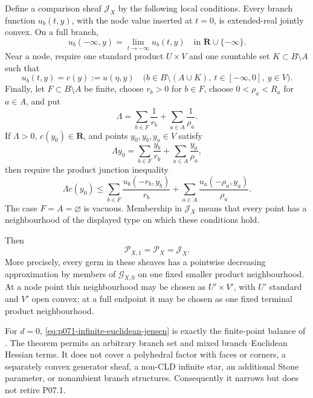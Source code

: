 \begin{theorem}
Define a comparison sheaf $\mathcal J_X$ by the following local
conditions.  Every branch function $u_b(t,y)$, with the node value
inserted at $t=0$, is extended-real jointly convex.  On a full branch,
\begin{equation}
 u_b(-\infty,y)=\lim_{t\to-\infty}u_b(t,y)
 \quad\text{in }\mathbf R\cup\{-\infty\}.
 \label{eq:p071-infinite-euclidean-endpoint-trace}
\end{equation}
Near a node, require one standard product $U\times V$ and one countable
set $K\subset B\setminus A$ such that
\begin{equation}
 u_b(t,y)=c(y):=u(\eta,y)
 \quad
 \bigl(b\in B\setminus(A\cup K),\ t\in[-\infty,0],\ y\in V\bigr).
 \label{eq:p071-infinite-euclidean-countable-activity}
\end{equation}
Finally, let $F\subset B\setminus A$ be finite, choose $r_b>0$ for
$b\in F$, choose $0<\rho_a<R_a$ for $a\in A$, and put
\[
 \Lambda=\sum_{b\in F}\frac1{r_b}
              +\sum_{a\in A}\frac1{\rho_a}.
\]
If $\Lambda>0$, $c(y_0)\in\mathbf R$, and points
$y_0,y_b,y_a\in V$ satisfy
\begin{equation}
 \Lambda y_0=
   \sum_{b\in F}\frac{y_b}{r_b}
      +\sum_{a\in A}\frac{y_a}{\rho_a},
 \label{eq:p071-infinite-euclidean-barycentre}
\end{equation}
then require the product junction inequality
\begin{equation}
 \Lambda c(y_0)\leq
   \sum_{b\in F}\frac{u_b(-r_b,y_b)}{r_b}
      +\sum_{a\in A}\frac{u_a(-\rho_a,y_a)}{\rho_a}.
 \label{eq:p071-infinite-euclidean-jensen}
\end{equation}
The case $F=A=\varnothing$ is vacuous.  Membership in
$\mathcal J_X$ means that every point has a neighbourhood of the
displayed type on which these conditions hold.

Then
\begin{equation}
                 \mathcal P_{X,1}=\mathcal P_X=\mathcal J_X.
 \label{eq:p071-infinite-euclidean-collapse}
\end{equation}
More precisely, every germ in these sheaves has a pointwise decreasing
approximation by members of $\mathcal G_{X,0}$ on one fixed smaller
product neighbourhood.  At a node point this neighbourhood may be chosen
as $U'\times V'$, with $U'$ standard and $V'$ open convex; at a
full endpoint it may be chosen as one fixed terminal product
neighbourhood.

For $d=0$, \eqref{eq:p071-infinite-euclidean-jensen} is exactly the
finite-point balance of
.  The theorem permits an
arbitrary branch set and mixed branch--Euclidean Hessian terms.  It does
not cover a polyhedral factor with faces or corners, a separately convex
generator sheaf, a non-CLD infinite star, an additional Stone parameter,
or nonambient branch structures.  Consequently it narrows but does not
retire P07.1.
\end{theorem}
